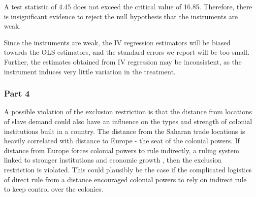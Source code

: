\documentclass{article}\usepackage[]{graphicx}\usepackage[]{color}
\begin{document}
A test statistic of 4.45 does not exceed the critical value of 16.85. Therefore, there is insignificant evidence to reject the null hypothesis that the instruments are weak.

Since the instruments are weak, the IV regression estimators will be biased towards the OLS estimators, and the standard errors we report will be too small.
Further, the estimates obtained from IV regression may be inconsistent, as the instrument induces very little variation in the treatment.

\subsubsection{Part 4}

A possible violation of the exclusion restriction is that the distance from locations of slave demand could also have an influence on the types and strength of colonial institutions built in a country.
The distance from the Saharan trade locations is heavily correlated with distance to Europe - the seat of the colonial powers.
If distance from Europe forces colonial powers to rule indirectly, a ruling system linked to stronger institutions and economic growth \parencite[][]{Iyer_2010}, then the exclusion restriction is violated.
This could plausibly be the case if the complicated logistics of direct rule from a distance encouraged colonial powers to rely on indirect rule to keep control over the colonies.
\end{document}
